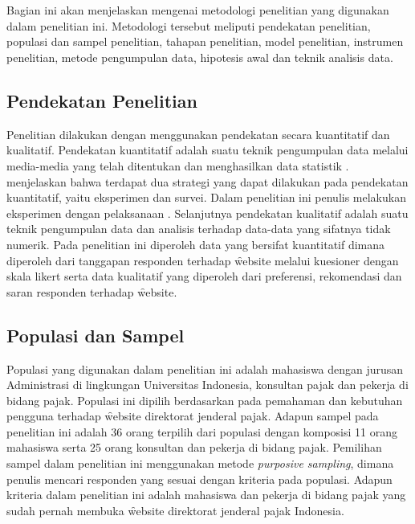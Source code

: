 \chapter{\babTiga}
Bagian ini akan menjelaskan mengenai metodologi penelitian yang digunakan dalam penelitian ini. Metodologi tersebut meliputi pendekatan penelitian, populasi dan sampel penelitian, tahapan penelitian, model penelitian, instrumen penelitian, metode pengumpulan data, hipotesis awal dan teknik analisis data.
\section{Pendekatan Penelitian}
Penelitian dilakukan dengan menggunakan pendekatan secara kuantitatif dan kualitatif. Pendekatan kuantitatif adalah suatu teknik pengumpulan data melalui media-media yang telah ditentukan dan menghasilkan data statistik \citep{buku.creswell}. \citeauthor{buku.creswell} menjelaskan bahwa terdapat dua strategi yang dapat dilakukan pada pendekatan kuantitatif, yaitu eksperimen dan survei. Dalam penelitian ini penulis melakukan eksperimen dengan pelaksanaan \ust. Selanjutnya pendekatan kualitatif adalah suatu teknik pengumpulan data dan analisis terhadap data-data yang sifatnya tidak numerik. Pada penelitian ini diperoleh data yang bersifat kuantitatif dimana diperoleh dari tanggapan responden terhadap \f{website} melalui kuesioner dengan skala likert serta data kualitatif yang diperoleh dari preferensi, rekomendasi dan saran responden terhadap \f{website}.
\section{Populasi dan Sampel}
Populasi yang digunakan dalam penelitian ini adalah mahasiswa dengan jurusan Administrasi di lingkungan Universitas Indonesia, konsultan pajak dan pekerja di bidang pajak. Populasi ini dipilih berdasarkan pada pemahaman dan kebutuhan pengguna terhadap \f{website} direktorat jenderal pajak. Adapun sampel pada penelitian ini adalah 36 orang terpilih dari populasi dengan komposisi 11 orang mahasiswa serta 25 orang konsultan dan pekerja di bidang pajak. Pemilihan sampel dalam penelitian ini menggunakan metode \textit{purposive sampling}, dimana penulis mencari responden yang sesuai dengan kriteria pada populasi. Adapun kriteria dalam penelitian ini adalah mahasiswa dan pekerja di bidang pajak yang sudah pernah membuka \f{website} direktorat jenderal pajak Indonesia.
